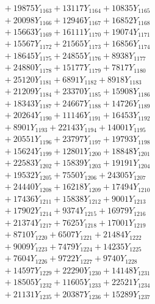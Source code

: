 \documentclass[a4paper,10pt]{article}
\begin{document}
{\begin{align}
&\;  + 19875 Y_{1163} + 13117 Y_{1164} + 10835 Y_{1165} \\[0.3ex]
&\;  + 20098 Y_{1166} + 12946 Y_{1167} + 16852 Y_{1168} \\[0.5ex]\allowbreak
&\;  + 15663 Y_{1169} + 16111 Y_{1170} + 19074 Y_{1171} \\[0.3ex]
&\;  + 15567 Y_{1172} + 21565 Y_{1173} + 16856 Y_{1174} \\[0.3ex]
&\;  + 18645 Y_{1175} + 24855 Y_{1176} + 8938 Y_{1177} \\[0.3ex]
&\;  + 24880 Y_{1178} + 15177 Y_{1179} + 7817 Y_{1180} \\[0.3ex]
&\;  + 25120 Y_{1181} + 6891 Y_{1182} + 8918 Y_{1183} \\[0.3ex]
&\;  + 21209 Y_{1184} + 23370 Y_{1185} + 15908 Y_{1186} \\[0.3ex]
&\;  + 18343 Y_{1187} + 24667 Y_{1188} + 14726 Y_{1189} \\[0.3ex]
&\;  + 20264 Y_{1190} + 11146 Y_{1191} + 16453 Y_{1192} \\[0.3ex]
&\;  + 8901 Y_{1193} + 22143 Y_{1194} + 14001 Y_{1195} \\[0.3ex]
&\;  + 20551 Y_{1196} + 23797 Y_{1197} + 19793 Y_{1198} \\[0.5ex]\allowbreak
&\;  + 15624 Y_{1199} + 12801 Y_{1200} + 18848 Y_{1201} \\[0.3ex]
&\;  + 22583 Y_{1202} + 15839 Y_{1203} + 19191 Y_{1204} \\[0.3ex]
&\;  + 19532 Y_{1205} + 7550 Y_{1206} + 24305 Y_{1207} \\[0.3ex]
&\;  + 24440 Y_{1208} + 16218 Y_{1209} + 17494 Y_{1210} \\[0.3ex]
&\;  + 17436 Y_{1211} + 15838 Y_{1212} + 9001 Y_{1213} \\[0.3ex]
&\;  + 17902 Y_{1214} + 9374 Y_{1215} + 16979 Y_{1216} \\[0.3ex]
&\;  + 21374 Y_{1217} + 7625 Y_{1218} + 17001 Y_{1219} \\[0.3ex]
&\;  + 8710 Y_{1220} + 6507 Y_{1221} + 21484 Y_{1222} \\[0.3ex]
&\;  + 9009 Y_{1223} + 7479 Y_{1224} + 14235 Y_{1225} \\[0.3ex]
&\;  + 7604 Y_{1226} + 9722 Y_{1227} + 9740 Y_{1228} \\[0.5ex]\allowbreak
&\;  + 14597 Y_{1229} + 22290 Y_{1230} + 14148 Y_{1231} \\[0.3ex]
&\;  + 18505 Y_{1232} + 11605 Y_{1233} + 22521 Y_{1234} \\[0.3ex]
&\;  + 21131 Y_{1235} + 20387 Y_{1236} + 15289 Y_{1237} \\[0.3ex]

\end{align}}
\end{document}

